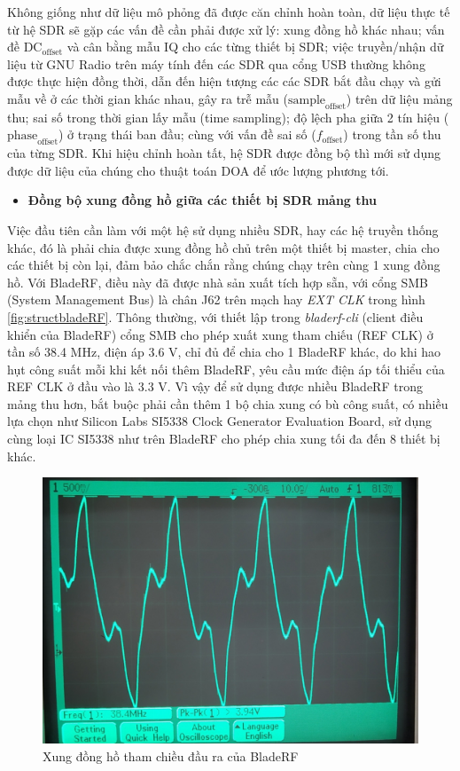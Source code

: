 {Không giống như dữ liệu mô phỏng đã được căn chỉnh hoàn toàn, dữ liệu thực tế từ hệ SDR sẽ gặp các vấn đề cần phải được xử lý: xung đồng hồ khác nhau; vấn đề $\textrm{DC}_\textrm{offset}$ và cân bằng mẫu IQ cho các từng thiết bị SDR;  việc truyền/nhận dữ liệu từ GNU Radio trên máy tính đến các SDR qua cổng USB thường không được thực hiện đồng thời, dẫn đến hiện tượng các các SDR bắt đầu chạy và gửi mẫu về ở các thời gian khác nhau, gây ra trễ mẫu ($\textrm{sample}_{\textrm{offset}}$) trên dữ liệu mảng thu; sai số trong thời gian lấy mẫu (\textrm{time sampling}); độ lệch pha giữa 2 tín hiệu ($\textrm{phase}_{\textrm{offset}}$) ở trạng thái ban đầu; cùng với vấn đề sai số ($f_{\textrm{offset}}$) trong tần số thu của từng SDR. Khi hiệu chỉnh hoàn tất, hệ SDR được đồng bộ thì mới sử dụng được dữ liệu của chúng cho thuật toán DOA để ước lượng phương tới.

\begin{itemize}
	\item \textbf{Đồng bộ xung đồng hồ giữa các thiết bị SDR mảng thu}
\end{itemize}

Việc đầu tiên cần làm với một hệ sử dụng nhiều SDR, hay các hệ truyền thống khác, đó là phải chia được xung đồng hồ chủ trên một thiết bị master, chia cho các thiết bị còn lại, đảm bảo chắc chắn rằng chúng chạy trên cùng 1 xung đồng hồ. Với BladeRF, điều này đã được nhà sản xuất tích hợp sẵn, với cổng SMB (System Management Bus) là chân J62 trên mạch hay \textit{EXT CLK} trong hình \ref{fig:structbladeRF}. Thông thường, với thiết lập trong \textit{bladerf-cli} (client điều khiển của BladeRF) cổng SMB cho phép xuất xung tham chiếu (REF CLK) ở tần số 38.4 MHz, điện áp 3.6 V, chỉ đủ để chia cho 1 BladeRF khác, do khi hao hụt công suất mỗi khi kết nối thêm BladeRF, yêu cầu mức điện áp tối thiểu của REF CLK ở đầu vào là 3.3 V. Vì vậy để sử dụng được nhiều BladeRF trong mảng thu hơn, bắt buộc phải cần thêm 1 bộ chia xung có bù công suất, có nhiều lựa chọn như Silicon Labs SI5338 Clock Generator Evaluation Board, sử dụng cùng loại IC SI5338 như trên BladeRF cho phép chia xung tối đa đến 8 thiết bị khác.

\begin{figure} [!h]
	\centering
	\includegraphics[width=0.75\linewidth]{figures/clk.jpg}
	\caption{Xung đồng hồ tham chiều đầu ra của BladeRF}
	\label{fig:clk}
\end{figure}

}
